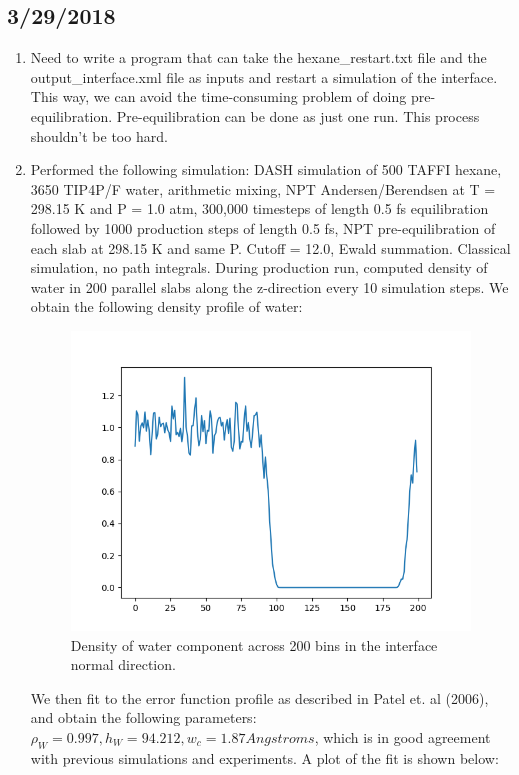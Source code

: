 \documentclass[12pt,reqno]{amsart}
\numberwithin{equation}{section}
\begin{document}
\subsection{3/29/2018}

\begin{enumerate}
\item Need to write a program that can take the hexane\_restart.txt file and the output\_interface.xml file as inputs and restart a simulation of the interface.  This way, we can avoid the time-consuming problem of doing pre-equilibration.  Pre-equilibration can be done as just one run.  This process shouldn't be too hard.  
\item Performed the following simulation: DASH simulation of 500 TAFFI hexane, 3650 TIP4P/F water, arithmetic mixing, NPT Andersen/Berendsen at T = 298.15 K and P = 1.0 atm, 300,000 timesteps of length 0.5 fs equilibration followed by 1000 production steps of length 0.5 fs, NPT pre-equilibration of each slab at 298.15 K and same P.  Cutoff = 12.0, Ewald summation.  Classical simulation, no path integrals.  During production run, computed density of water in 200 parallel slabs along the z-direction every 10 simulation steps.  We obtain the following density profile of water:

\begin{figure}[H]
\centering
\includegraphics[scale=0.4]{water_density_profile}
\caption{Density of water component across 200 bins in the interface normal direction.}
\end{figure}

We then fit to the error function profile as described in Patel et. al (2006), and obtain the following parameters: $\rho_W = 0.997, h_W = 94.212, w_c = 1.87 Angstroms$, which is in good agreement with previous simulations and experiments.  A plot of the fit is shown below: 


\end{enumerate}
\end{document}
